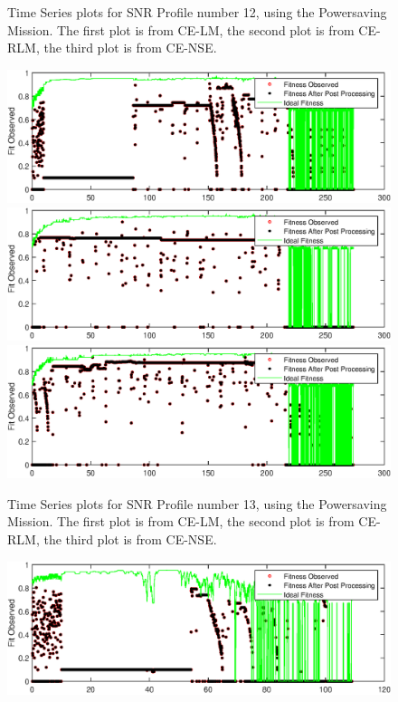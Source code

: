 \begin{appendices}
\begin{figure}[ht!]
\caption{Time Series plots for SNR Profile number 12, using the Powersaving Mission. The first plot is from CE-LM, the second plot is from CE-RLM, the third plot is from CE-NSE.}
\end{figure}
\begin{figure}[ht!]
\includegraphics{figures/c_sim_timeSeries/Fitness_timeSeries_LM_13.eps}
\includegraphics{figures/c_sim_timeSeries/Fitness_timeSeries_RLM_13.eps}
\includegraphics{figures/c_sim_timeSeries/Fitness_timeSeries_NSE_13.eps}
\caption{Time Series plots for SNR Profile number 13, using the Powersaving Mission. The first plot is from CE-LM, the second plot is from CE-RLM, the third plot is from CE-NSE.}
\end{figure}
\begin{figure}[ht!]
\includegraphics{figures/c_sim_timeSeries/Fitness_timeSeries_LM_14.eps}

\end{figure}
\end{appendices}

